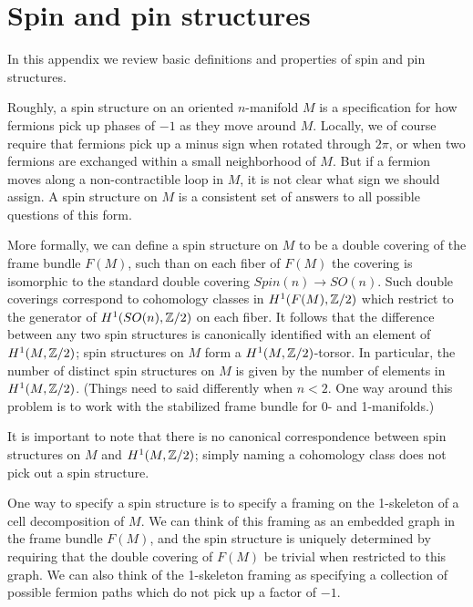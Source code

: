 

\section{Spin and pin structures} \label{spin_and_pin}

%

In this appendix we review basic definitions and properties of spin and pin structures.

\medskip

Roughly, a spin structure on an oriented $n$-manifold $M$ is a specification for how fermions pick up phases of $-1$ as they move around $M$.
Locally, we of course require that fermions pick up a minus sign when rotated through $2\pi$,
or when two fermions are exchanged within a small neighborhood of $M$.
But if a fermion moves along a non-contractible loop in $M$, it is not clear what sign we should assign.
A spin structure on $M$ is a consistent set of answers to all possible questions of this form.

More formally, we can define a spin structure on $M$ to be a double covering of the frame bundle $F(M)$, such than on each fiber of $F(M)$
the covering is isomorphic to the standard double covering $Spin(n) \to SO(n)$.
Such double coverings correspond to cohomology classes in $H^1(F(M), \mathbb{Z}/2)$ which restrict to the generator of $H^1(SO(n), \mathbb{Z}/2)$ on each fiber.
It follows that the difference between any two spin structures is canonically identified
with an element of $H^1(M, \mathbb{Z}/2)$; spin structures on $M$ form a $H^1(M, \mathbb{Z}/2)$-torsor.
In particular, the number of distinct spin structures on $M$ is given by the number of elements in $H^1(M, \mathbb{Z}/2)$.
(Things need to said differently when $n<2$.
One way around this problem is to work with the stabilized frame bundle for 0- and 1-manifolds.)

It is important to note that there is no canonical correspondence between spin structures on $M$ and $H^1(M, \mathbb{Z}/2)$; simply naming
a cohomology class does not pick out a spin structure.

One way to specify a spin structure is to specify a framing on the 1-skeleton of a cell decomposition of $M$.
We can think of this framing as an embedded graph in the frame bundle $F(M)$, and the spin structure is uniquely determined by requiring
that the double covering of $F(M)$ be trivial when restricted to this graph.
We can also think of the 1-skeleton framing as specifying a collection of possible fermion paths which do not pick up a factor of $-1$.

